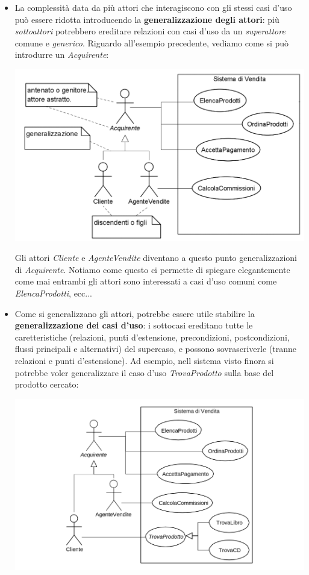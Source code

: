 \documentclass[a4paper,11pt]{article}
\begin{document}
\begin{itemize}
	\item La complessità data da più attori che interagiscono con gli stessi casi d'uso può essere ridotta introducendo la \textbf{generalizzazione degli attori}: più \textit{sottoattori} potrebbero ereditare relazioni con casi d'uso da un \textit{superattore} comune e \textit{generico}.
		Riguardo all'esempio precedente, vediamo come si può introdurre un \textit{Acquirente}:
\begin{center}
	\includegraphics[scale=0.3]{../figures/general_attori_casi_uso.png}
\end{center}
Gli attori \textit{Cliente} e \textit{AgenteVendite} diventano a questo punto generalizzazioni di \textit{Acquirente}.
Notiamo come questo ci permette di spiegare elegantemente come mai entrambi gli attori sono interessati a casi d'uso comuni come \textit{ElencaProdotti}, ecc...

	\item Come si generalizzano gli attori, potrebbe essere utile stabilire la \textbf{generalizzazione dei casi d'uso}: i sottocasi ereditano tutte le caretteristiche (relazioni, punti d'estensione, precondizioni, postcondizioni, flussi principali e alternativi) del supercaso, e possono sovrascriverle (tranne relazioni e punti d'estensione).
		Ad esempio, nell sistema visto finora si potrebbe voler generalizzare il caso d'uso \textit{TrovaProdotto} sulla base del prodotto cercato:
\begin{center}
	\includegraphics[scale=0.35]{../figures/general_casi_uso.png}
\end{center}


\end{itemize}
\end{document}
